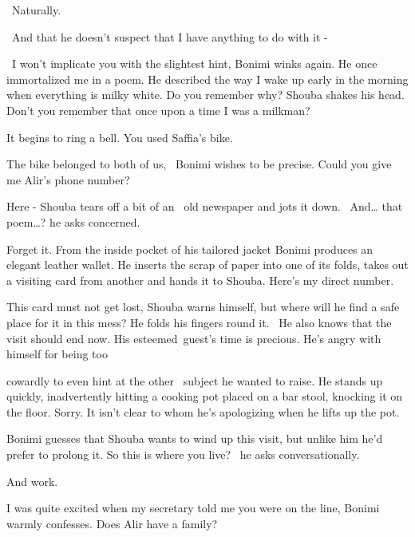 \documentclass[12pt]{book}
\begin{document}
~{\textquotedbl}Naturally.{\textquotedbl}

~{\textquotedbl}And that he doesn't suspect that I have anything to do with it -{\textquotedbl}

~{\textquotedbl}I won't implicate you with the slightest hint,{\textquotedbl} Bonimi winks again. {\textquotedbl}He once
immortalized me in a poem. He described the way I wake up early in the morning when everything is milky white. Do you
remember why?{\textquotedbl} Shouba shakes his head. {\textquotedbl}Don't you remember that once upon a time I was a
milkman?{\textquotedbl}

{\textquotedbl}It begins to ring a bell. You used Saffia's bike.{\textquotedbl}

{\textquotedbl}The bike belonged to both of us,{\textquotedbl} \ Bonimi wishes to be precise. {\textquotedbl}Could you
give me Alir's phone number?{\textquotedbl}

{\textquotedbl}Here -{\textquotedbl} Shouba tears off {a bit of an \ }old newspaper and jots it down.
\ {\textquotedbl}And{\dots} that poem{\dots}?{\textquotedbl} he asks concerned.

{\textquotedbl}Forget it.{\textquotedbl} From the inside pocket of his tailored jacket Bonimi produces an elegant
leather wallet. He inserts the scrap of paper into one of its folds, takes out a visiting card from another and hands
it to Shouba. {\textquotedbl}Here's my direct number.{\textquotedbl}

This card must not get lost, Shouba warns himself, but where will he find a safe place for it in this mess? He folds his
fingers round it. \ He also knows that the visit should end now. His esteemed~guest's time is precious.
He's{ }angry with himself for being too

cowardly to even hint at the other \ subject he wanted to raise. He stands up quickly, inadvertently hitting a cooking
pot placed on a bar stool, knocking it on the floor. {\textquotedbl}Sorry.{\textquotedbl} It isn't clear to whom he's
apologizing when he lifts up the pot.

Bonimi guesses that Shouba wants to wind up this visit, but unlike him he'd prefer to prolong it. {\textquotedbl}So this
is where you live?{\textquotedbl} \ he asks conversationally.

{\textquotedbl}And work.{\textquotedbl}

{\textquotedbl}I was quite excited when my secretary told me you were on the line,{\textquotedbl} Bonimi warmly
confesses. {\textquotedbl}Does Alir have a family?{\textquotedbl}
\end{document}
